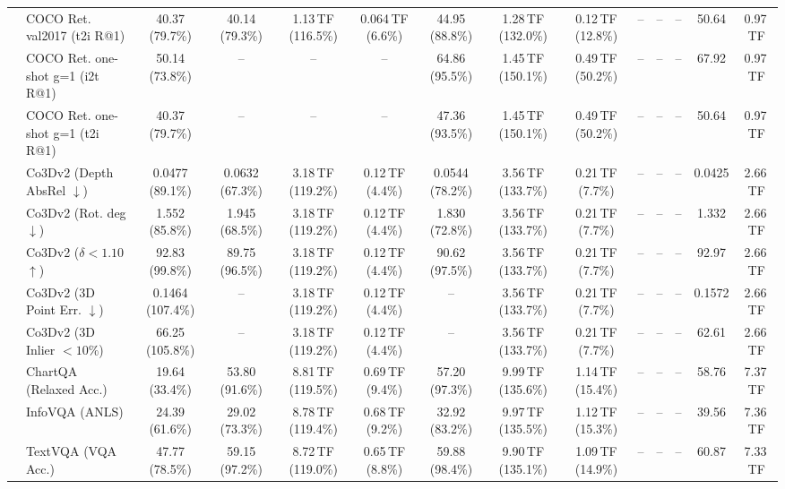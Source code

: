 \begin{table}[t]
\begin{center}
\begin{small}
\begin{sc}
{\begin{tabular}{llcccccccccccc}
& COCO Ret. val2017 (t2i R@1) & 40.37 (79.7\%) & 40.14 (79.3\%) & 1.13\,TF (116.5\%) & 0.064\,TF (6.6\%) & 44.95 (88.8\%) & 1.28\,TF (132.0\%) & 0.12\,TF (12.8\%) & -- & -- & -- & 50.64 & 0.97\,TF \\
& COCO Ret. one-shot g=1 (i2t R@1) & 50.14 (73.8\%) & -- & -- & -- & 64.86 (95.5\%) & 1.45\,TF (150.1\%) & 0.49\,TF (50.2\%) & -- & -- & -- & 67.92 & 0.97\,TF \\
& COCO Ret. one-shot g=1 (t2i R@1) & 40.37 (79.7\%) & -- & -- & -- & 47.36 (93.5\%) & 1.45\,TF (150.1\%) & 0.49\,TF (50.2\%) & -- & -- & -- & 50.64 & 0.97\,TF \\
\midrule
{}
& Co3Dv2 (Depth AbsRel $\downarrow$) & 0.0477 (89.1\%) & 0.0632 (67.3\%) & 3.18\,TF (119.2\%) & 0.12\,TF (4.4\%) & 0.0544 (78.2\%) & 3.56\,TF (133.7\%) & 0.21\,TF (7.7\%) & -- & -- & -- & 0.0425 & 2.66\,TF \\
& Co3Dv2 (Rot. deg $\downarrow$) & 1.552 (85.8\%) & 1.945 (68.5\%) & 3.18\,TF (119.2\%) & 0.12\,TF (4.4\%) & 1.830 (72.8\%) & 3.56\,TF (133.7\%) & 0.21\,TF (7.7\%) & -- & -- & -- & 1.332 & 2.66\,TF \\
& Co3Dv2 ($\delta < 1.10$ $\uparrow$) & 92.83 (99.8\%) & 89.75 (96.5\%) & 3.18\,TF (119.2\%) & 0.12\,TF (4.4\%) & 90.62 (97.5\%) & 3.56\,TF (133.7\%) & 0.21\,TF (7.7\%) & -- & -- & -- & 92.97 & 2.66\,TF \\
& Co3Dv2 (3D Point Err. $\downarrow$) & 0.1464 (107.4\%) & -- & 3.18\,TF (119.2\%) & 0.12\,TF (4.4\%) & -- & 3.56\,TF (133.7\%) & 0.21\,TF (7.7\%) & -- & -- & -- & 0.1572 & 2.66\,TF \\
& Co3Dv2 (3D Inlier $<10\%$) & 66.25 (105.8\%) & -- & 3.18\,TF (119.2\%) & 0.12\,TF (4.4\%) & -- & 3.56\,TF (133.7\%) & 0.21\,TF (7.7\%) & -- & -- & -- & 62.61 & 2.66\,TF \\
\midrule\midrule
{}
& ChartQA (Relaxed Acc.) & 19.64 (33.4\%) & 53.80 (91.6\%) & 8.81\,TF (119.5\%) & 0.69\,TF (9.4\%) & 57.20 (97.3\%) & 9.99\,TF (135.6\%) & 1.14\,TF (15.4\%) & -- & -- & -- & 58.76 & 7.37\,TF \\
& InfoVQA (ANLS) & 24.39 (61.6\%) & 29.02 (73.3\%) & 8.78\,TF (119.4\%) & 0.68\,TF (9.2\%) & 32.92 (83.2\%) & 9.97\,TF (135.5\%) & 1.12\,TF (15.3\%) & -- & -- & -- & 39.56 & 7.36\,TF \\
& TextVQA (VQA Acc.) & 47.77 (78.5\%) & 59.15 (97.2\%) & 8.72\,TF (119.0\%) & 0.65\,TF (8.8\%) & 59.88 (98.4\%) & 9.90\,TF (135.1\%) & 1.09\,TF (14.9\%) & -- & -- & -- & 60.87 & 7.33\,TF \\

\end{tabular}}
\end{sc}
\end{small}
\end{center}
\end{table}
